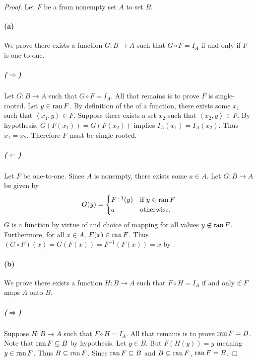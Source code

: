 \documentclass{report}
\newcommand{\pair}[1]{\left< #1 \right>}
\begin{document}
\begin{proof}

  Let $F$ be a  from nonempty set $A$ to set $B$.

  \paragraph{(a)}%

    We prove there exists a function $G \colon B \rightarrow A$ such that
      $G \circ F = I_A$ if and only if $F$ is one-to-one.

    \subparagraph{($\Rightarrow$)}%

      Let $G \colon B \rightarrow A$ such that $G \circ F = I_A$.
      All that remains is to prove $F$ is single-rooted.
      Let $y \in \mathop{\text{ran}}{F}$.
      By definition of the  of a function, there exists some
        $x_1$ such that $\pair{x_1, y} \in F$.
      Suppose there exists a set $x_2$ such that $\pair{x_2, y} \in F$.
      By hypothesis, $G(F(x_1)) = G(F(x_2))$ implies $I_A(x_1) = I_A(x_2)$.
      Thus $x_1 = x_2$.
      Therefore $F$ must be single-rooted.

    \subparagraph{($\Leftarrow$)}%

      Let $F$ be one-to-one.
      Since $A$ is nonempty, there exists some $a \in A$.
      Let $G \colon B \rightarrow A$ be given by
        $$G(y) = \begin{cases}
          F^{-1}(y) & \text{if } y \in \mathop{\text{ran}}{F} \\
          a & \text{otherwise}.
        \end{cases}$$
      $G$ is a function by virtue of  and choice of mapping
        for all values $y \not\in \mathop{\text{ran}}{F}$.
      Furthermore, for all $x \in A$, $F(x) \in \mathop{\text{ran}}{F}$.
      Thus $(G \circ F)(x) = G(F(x)) = F^{-1}(F(x)) = x$ by
        .

  \paragraph{(b)}%

    We prove there exists a function $H \colon B \rightarrow A$ such that
      $F \circ H = I_A$ if and only if $F$ maps $A$ onto $B$.

    \subparagraph{($\Rightarrow$)}%

      Suppose $H \colon B \rightarrow A$ such that $F \circ H = I_A$.
      All that remains is to prove $\mathop{\text{ran}}{F} = B$.
      Note that $\mathop{\text{ran}}{F} \subseteq B$ by hypothesis.
      Let $y \in B$.
      But $F(H(y)) = y$ meaning $y \in \mathop{\text{ran}}{F}$.
      Thus $B \subseteq \mathop{\text{ran}}{F}$.
      Since $\mathop{\text{ran}}{F} \subseteq B$ and $B \subseteq \mathop{\text{ran}}{F}$, $\mathop{\text{ran}}{F} = B$.


\end{proof}
\end{document}
